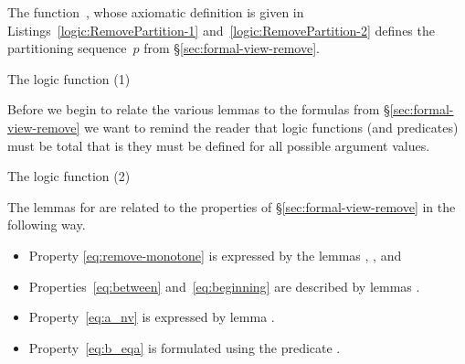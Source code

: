 The function~\RemovePartition, whose axiomatic definition is given in 
Listings~\ref{logic:RemovePartition-1} and~\ref{logic:RemovePartition-2}
defines the partitioning sequence~$p$ from \S\ref{sec:formal-view-remove}.


\begin{logic}[hbt]
\begin{minipage}{\textwidth}

\end{minipage}
\caption{ The logic function \RemovePartition (1)}


\end{logic}

\FloatBarrier

Before we begin to relate the various lemmas
to the formulas from \S\ref{sec:formal-view-remove} we want to remind
the reader that logic functions (and predicates) must be total that is they must
be defined for all possible argument values.

\begin{logic}[hbt]
\begin{minipage}{\textwidth}

\end{minipage}
\caption{The logic function \RemovePartition (2)}
\end{logic}

\FloatBarrier

The lemmas for \RemovePartition are related to the properties of 
\S\ref{sec:formal-view-remove} in the following way.

\begin{itemize}
  \item Property \eqref{eq:remove-monotone} is expressed by the lemmas
  \RemovePartitionEmpty, \RemovePartitionLeft
  \RemovePartitionRight, and \RemovePartitionStrictlyWeakIncreasing

  \item Properties~\eqref{eq:between} and~\eqref{eq:beginning}
  are described by lemmas \RemovePartitionSegment.

  \item Property~\eqref{eq:a_nv} is expressed by lemma \RemovePartitionNotEqual.

  \item Property~\eqref{eq:b_eqa} is formulated using the predicate .
\end{itemize}

